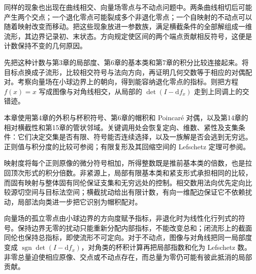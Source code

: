 同样的现象也出现在曲线相交、向量场零点与不动点问题中。两条曲线相切后可能产生两个交点；一个退化零点可能裂成多个非退化零点；一个自映射的不动点可以随着映射改变而移动。把这些现象放进一参数族，满足横截条件的全部解组成一维流形，其边界记录初、末状态。方向规定使区间的两个端点贡献相反符号，这便是计数保持不变的几何原因。

\ProseParagraphBreak

先把这种计数与第3章的局部度、第6章的基本类和第7章的积分比较连接起来。将目标点换成子流形，比较相交符号与法向方向，再证明几何交数等于相应的对偶配对。考察向量场在小球边界上的朝向，得到能容纳退化零点的指标。则把方程 \(f(x)=x\) 写成图像与对角线相交，从局部的 \(\det(I-\mathrm{d}f_x)\) 走到上同调上的交错迹。

\ProseParagraphBreak

本章使用第4章的外积与杯积符号、第6章的帽积和 Poincaré 对偶，以及第14章的相对横截性和第15章的管状邻域。关键调用处会恢复定向、维数、紧性及支集条件：它们决定交集是否有限、符号能否连续选择，以及一族解是否会逃到无穷远。正则值与积分度的比较可参阅\cite[第457--459页，定理17.35及命题17.36]{Lee2012Smooth}；有限复形及其回缩空间的 Lefschetz 定理可参阅\cite[第2.C节，The Lefschetz Fixed Point Theorem]{Hatcher2002}。






\begin{chaptersummary}
	映射度将每个正则原像的微分符号相加，所得整数既是推前基本类的倍数，也是拉回顶次形式的积分倍数。非紧源上，局部有限基本类和紧支形式承担相同的比较，而固有映射与整体固有同伦保证支集和无穷远处的控制。相交数用法向优先定向比较源切空间与目标法空间；横截扰动给出有限计数，有向一维配边保证它不依赖扰动，局部法向类进一步把它识别为帽积配对。

	\ProseParagraphBreak

	向量场的孤立零点由小球边界的方向度赋予指标，非退化时为线性化行列式的符号。保持边界无零的扰动只能重新分配内部指标，不能改变总和；闭流形上的截面同伦也保持总指标，即使流形不可定向。对于不动点，图像与对角线把同一局部度变成 \(\operatorname{sgn}\det(I-\mathrm{d}f_x)\)，对角类的杯积计算再把局部指数和化为 Lefschetz 数。非零总量迫使相应原像、交点或不动点存在，而总量为零仍可能有彼此抵消的局部贡献。
\end{chaptersummary}

\BookExercises

